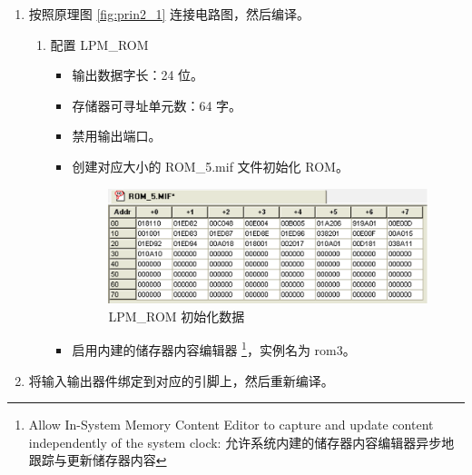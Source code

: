 \begin{enumerate}
    \item 按照原理图 \ref{fig:prin2_1} 连接电路图，然后编译。
    
    \begin{enumerate}
        \item 配置 LPM\_ROM
        
        \begin{itemize}
            \item 输出数据字长：24 位。
            \item 存储器可寻址单元数：64 字。
            \item 禁用输出端口。
            \item 创建对应大小的 ROM\_5.mif 文件初始化 ROM。
            
            \begin{figure}[H]
            \centering
            \includegraphics[width=\textwidth]{images/init2_1.png}
            \caption{LPM\_ROM 初始化数据}
            \label{fig:init2_1}
            \end{figure}
            
            \item 启用内建的储存器内容编辑器 \footnote{Allow In-System Memory Content Editor to capture and update content independently of the system clock: 允许系统内建的储存器内容编辑器异步地跟踪与更新储存器内容}，实例名为 rom3。
        \end{itemize}
        
    \end{enumerate}
    
    \item 将输入输出器件绑定到对应的引脚上，然后重新编译。
    

\end{enumerate}
